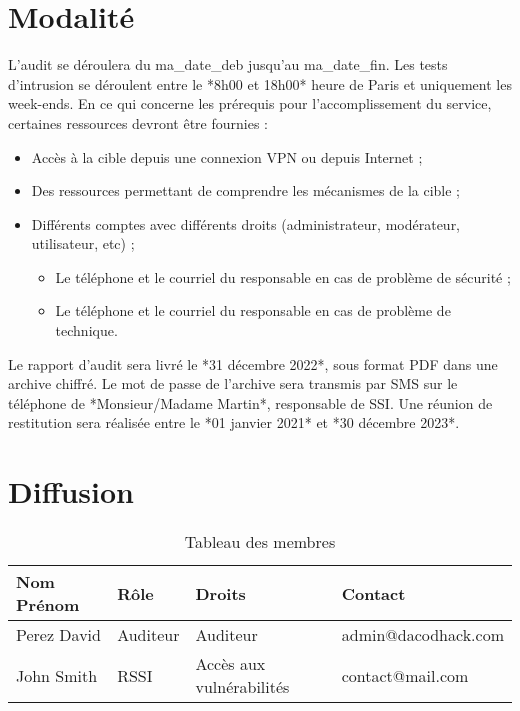 \documentclass[12pt]{extarticle}
\begin{document}
\chapter{Modalité}
    L’audit se déroulera du ma_date_deb jusqu’au ma_date_fin. Les tests d’intrusion se déroulent entre le *8h00 et 18h00* heure de Paris et uniquement les week-ends.
    En ce qui concerne les prérequis pour l’accomplissement du service, certaines ressources devront être fournies :
    \begin{itemize}
        \item Accès à la cible depuis  une connexion VPN ou depuis Internet ;
        \item Des ressources permettant de comprendre les mécanismes de la cible ;
        \item Différents comptes avec différents droits (administrateur, modérateur, utilisateur, etc) ;
        \begin{itemize}
            \item Le téléphone et le courriel du responsable en cas de problème de sécurité ;
            \item Le téléphone et le courriel du responsable en cas de problème de technique.
        \end{itemize}
    \end{itemize}
    Le rapport d’audit sera livré le *31 décembre 2022*, sous format PDF dans une archive chiffré. Le mot de passe de l’archive sera transmis par SMS sur le téléphone de *Monsieur/Madame Martin*, responsable de SSI.
    Une réunion de restitution sera réalisée entre le *01 janvier 2021* et  *30 décembre 2023*.
\chapter{Diffusion}
    \begin{table}[h]
        \centering
        \caption{Tableau des membres}
        \begin{tabular}{|l|l|l|l|}
            \hline
            \textbf{Nom Prénom} & \textbf{Rôle} & \textbf{Droits} & \textbf{Contact} \\
            \hline
            Perez David         & Auditeur      & Auditeur        & admin@dacodhack.com \\
            \hline
            John Smith          & RSSI          & Accès aux vulnérabilités & contact@mail.com \\
            \hline
        \end{tabular}
        \label{tab:membres}
    \end{table}
\end{document}

